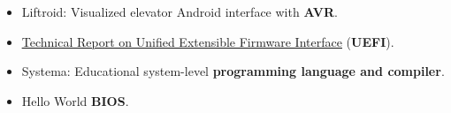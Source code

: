 \documentclass[letterpaper]{twentysecondcv} %
\newcommand{\myhy}[2]{\underline{\href{#1}{#2}}}
\begin{document}
\begin{itemize}
{          for OS course at Alexandria University.}
    \item{Liftroid: Visualized elevator Android interface with \textbf{{AVR}}.}
    \item{\myhy{https://github.com/iocoder/uefi_report/raw/master/final_report.pdf}{Technical Report on Unified Extensible Firmware Interface}
          (\textbf{{UEFI}}).}
    \item{Systema: Educational system-level \textbf{{programming language and compiler}}.}
    \item{Hello World \textbf{{BIOS}}.}
\end{itemize}


%

\end{document}
